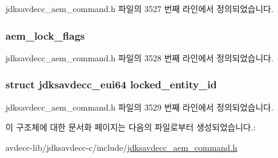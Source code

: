 jdksavdecc\+\_\+aem\+\_\+command.\+h 파일의 3527 번째 라인에서 정의되었습니다.

\subsubsection[{\texorpdfstring{aem\+\_\+lock\+\_\+flags}{aem_lock_flags}}]{ aem\+\_\+lock\+\_\+flags}\hypertarget{structjdksavdecc__aem__command__lock__entity__response_a6203f9642ca069acf13bc5f085acc9d0}{}\label{structjdksavdecc__aem__command__lock__entity__response_a6203f9642ca069acf13bc5f085acc9d0}


jdksavdecc\+\_\+aem\+\_\+command.\+h 파일의 3528 번째 라인에서 정의되었습니다.

\subsubsection[{\texorpdfstring{locked\+\_\+entity\+\_\+id}{locked_entity_id}}]{\setlength{\rightskip}{0pt plus 5cm}struct {\bf jdksavdecc\+\_\+eui64} locked\+\_\+entity\+\_\+id}\hypertarget{structjdksavdecc__aem__command__lock__entity__response_a397afd1623d57ce0b39e414e537ee497}{}\label{structjdksavdecc__aem__command__lock__entity__response_a397afd1623d57ce0b39e414e537ee497}


jdksavdecc\+\_\+aem\+\_\+command.\+h 파일의 3529 번째 라인에서 정의되었습니다.



이 구조체에 대한 문서화 페이지는 다음의 파일로부터 생성되었습니다.\+:\begin{DoxyCompactItemize}
\item 
avdecc-\/lib/jdksavdecc-\/c/include/\hyperlink{jdksavdecc__aem__command_8h}{jdksavdecc\+\_\+aem\+\_\+command.\+h}\end{DoxyCompactItemize}
